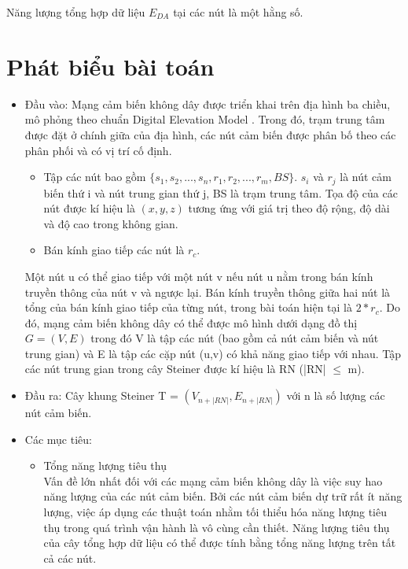 \documentclass{hust}
\begin{document}
Năng lượng tổng hợp dữ liệu $E_{DA}$ tại các nút là một hằng số.


\section{Phát biểu bài toán} \label{problem}
\begin{itemize}
	\item 
	Đầu vào: Mạng cảm biến không dây được triển khai trên địa hình ba chiều, mô phỏng theo chuẩn Digital Elevation Model \cite{mukherjee2013evaluation}. Trong đó, trạm trung tâm được đặt ở chính giữa của địa hình, các nút cảm biến được phân bố theo các phân phối và có vị trí cố định. 
	\begin{itemize}
		\item
		Tập các nút bao gồm $\{s_{1},s_{2},...,s_{n},r_{1},r_{2},...,r_{m},BS\}$. $s_{i}$ và $r_{j}$ là nút cảm biến thứ i và nút trung gian thứ j, BS là trạm trung tâm. Tọa độ của các nút được kí hiệu là $(x,y,z)$ tương ứng với giá trị theo độ rộng, độ dài và độ cao trong không gian.
		\item
		Bán kính giao tiếp các nút là $r_{c}$.
	\end{itemize}
	Một nút u có thể giao tiếp với một nút v nếu nút u nằm trong bán kính truyền thông của nút v và ngược lại. Bán kính truyền thông giữa hai nút là tổng của bán kính giao tiếp của từng nút, trong bài toán hiện tại là $2*r_{c}$. Do đó, mạng cảm biến không dây có thể được mô hình dưới dạng đồ thị $G = (V,E)$ trong đó V là tập các nút (bao gồm cả nút cảm biến và nút trung gian) và E là tập các cặp nút (u,v) có khả năng giao tiếp với nhau. Tập các nút trung gian trong cây Steiner được kí hiệu là RN (|RN| $\leq$ m).
	
	\item
	Đầu ra:  Cây khung Steiner T = $(V_{n+|RN|},E_{n+|RN|})$ với n là số lượng các nút cảm biến.
	
	\item
	Các mục tiêu:
	\begin{itemize}
		\item{Tổng năng lượng tiêu thụ} \\
		Vấn đề lớn nhất đối với các mạng cảm biến không dây là việc suy hao năng lượng của các nút cảm biến. Bởi các nút cảm biến dự trữ rất ít năng lượng, việc áp dụng các thuật toán nhằm tối thiểu hóa năng lượng tiêu thụ trong quá trình vận hành là vô cùng cần thiết. Năng lượng tiêu thụ của cây tổng hợp dữ liệu có thể được tính bằng tổng năng lượng trên tất cả các nút.
		

\end{itemize}
\end{itemize}
\end{document}
